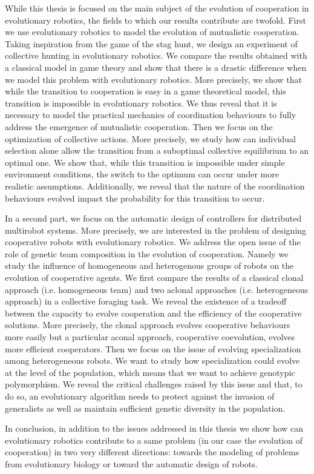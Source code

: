 	While this thesis is focused on the main subject of the evolution of cooperation in evolutionary robotics, the fields to which our results contribute are twofold. First we use evolutionary robotics to model the evolution of mutualistic cooperation. Taking inspiration from the game of the stag hunt, we design an experiment of collective hunting in evolutionary robotics. We compare the results obtained with a classical model in game theory and show that there is a drastic difference when we model this problem with evolutionary robotics. More precisely, we show that while the transition to cooperation is easy in a game theoretical model, this transition is impossible in evolutionary robotics. We thus reveal that it is necessary to model the practical mechanics of coordination behaviours to fully address the emergence of mutualistic cooperation. Then we focus on the optimization of collective actions. More precisely, we study how can individual selection alone allow the transition from a suboptimal collective equilibrium to an optimal one. We show that, while this transition is impossible under simple environment conditions, the switch to the optimum can occur under more realistic assumptions. Additionally, we reveal that the nature of the coordination behaviours evolved impact the probability for this transition to occur.

	In a second part, we focus on the automatic design of controllers for distributed multirobot systems. More precisely, we are interested in the problem of designing cooperative robots with evolutionary robotics. We address the open issue of the role of genetic team composition in the evolution of cooperation. Namely we study the influence of homogeneous and heterogenous groups of robots on the evolution of cooperative agents. We first compare the results of a classical clonal approach (i.e. homogeneous team) and two aclonal approaches (i.e. heterogeneous approach) in a collective foraging task. We reveal the existence of a tradeoff between the capacity to evolve cooperation and the efficiency of the cooperative solutions. More precisely, the clonal approach evolves cooperative behaviours more easily but a particular aconal approach, cooperative coevolution, evolves more efficient cooperators. Then we focus on the issue of evolving specialization among heterogeneous robots. We want to study how specialization could evolve at the level of the population, which means that we want to achieve genotypic polymorphism. We reveal the critical challenges raised by this issue and that, to do so, an evolutionary algorithm needs to protect against the invasion of generalists as well as maintain sufficient genetic diversity in the population.

	In conclusion, in addition to the issues addressed in this thesis we show how can evolutionary robotics contribute to a same problem (in our case the evolution of cooperation) in two very different directions: towards the modeling of problems from evolutionary biology or toward the automatic design of robots.